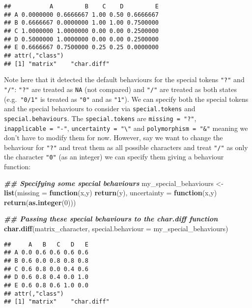 \documentclass[
]{book}
\newenvironment{Shaded}{\begin{snugshade}}{\end{snugshade}}
\newcommand{\AttributeTok}[1]{\textcolor[rgb]{0.13,0.29,0.53}{#1}}
\newcommand{\ControlFlowTok}[1]{\textcolor[rgb]{0.13,0.29,0.53}{\textbf{#1}}}
\newcommand{\DecValTok}[1]{\textcolor[rgb]{0.00,0.00,0.81}{#1}}
\newcommand{\DocumentationTok}[1]{\textcolor[rgb]{0.56,0.35,0.01}{\textbf{\textit{#1}}}}
\newcommand{\FunctionTok}[1]{\textcolor[rgb]{0.13,0.29,0.53}{\textbf{#1}}}
\newcommand{\NormalTok}[1]{#1}
\newcommand{\OtherTok}[1]{\textcolor[rgb]{0.56,0.35,0.01}{#1}}
\begin{document}
\begin{verbatim}
##           A         B    C    D         E
## A 0.0000000 0.6666667 1.00 0.50 0.6666667
## B 0.6666667 0.0000000 1.00 1.00 0.7500000
## C 1.0000000 1.0000000 0.00 0.00 0.2500000
## D 0.5000000 1.0000000 0.00 0.00 0.2500000
## E 0.6666667 0.7500000 0.25 0.25 0.0000000
## attr(,"class")
## [1] "matrix"    "char.diff"
\end{verbatim}

Note here that it detected the default behaviours for the special tokens \texttt{"?"} and \texttt{"/"}: \texttt{"?"} are treated as \texttt{NA} (not compared) and \texttt{"/"} are treated as both states (e.g.~\texttt{"0/1"} is treated as \texttt{"0"} and as \texttt{"1"}).
We can specify both the special tokens and the special behaviours to consider via \texttt{special.tokens} and \texttt{special.behaviours}.
The \texttt{special.tokens} are \texttt{missing\ =\ "?"}, \texttt{inapplicable\ =\ "-"}, \texttt{uncertainty\ =\ "\textbackslash{}"} and \texttt{polymorphism\ =\ "\&"} meaning we don't have to modify them for now.
However, say we want to change the behaviour for \texttt{"?"} and treat them as all possible characters and treat \texttt{"/"} as only the character \texttt{"0"} (as an integer) we can specify them giving a behaviour function:

\begin{Shaded}
\begin{Highlighting}[]
\DocumentationTok{\#\# Specifying some special behaviours}
\NormalTok{my\_special\_behaviours }\OtherTok{\textless{}{-}} \FunctionTok{list}\NormalTok{(}\AttributeTok{missing =} \ControlFlowTok{function}\NormalTok{(x,y) }\FunctionTok{return}\NormalTok{(y),}
                              \AttributeTok{uncertainty =} \ControlFlowTok{function}\NormalTok{(x,y) }\FunctionTok{return}\NormalTok{(}\FunctionTok{as.integer}\NormalTok{(}\DecValTok{0}\NormalTok{)))}

\DocumentationTok{\#\# Passing these special behaviours to the char.diff function}
\FunctionTok{char.diff}\NormalTok{(matrix\_character, }\AttributeTok{special.behaviour =}\NormalTok{ my\_special\_behaviours)}
\end{Highlighting}
\end{Shaded}

\begin{verbatim}
##     A   B   C   D   E
## A 0.0 0.6 0.6 0.6 0.6
## B 0.6 0.0 0.8 0.8 0.8
## C 0.6 0.8 0.0 0.4 0.6
## D 0.6 0.8 0.4 0.0 1.0
## E 0.6 0.8 0.6 1.0 0.0
## attr(,"class")
## [1] "matrix"    "char.diff"
\end{verbatim}
\end{document}
